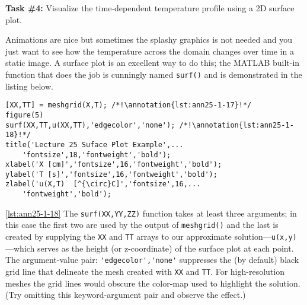 \vspace{0.25cm}
\setcounter{lstannotation}{0} %
\noindent\textbf{Task \#4: } Visualize the time-dependent temperature profile using a 2D surface plot.

\vspace{0.15cm}

\noindent Animations are nice but sometimes the splashy graphics is not needed and you just want to see how the temperature across the domain changes over time in a static image.  A surface plot is an excellent way to do this; the MATLAB built-in function that does the job is cunningly named \lstinline[style=myMatlab]{surf()} and is demonstrated in the listing below.
\begin{lstlisting}[style=myMatlab, name=lec25-ex1]
%% Plot the temperature vs time in a 2D plot using the surf function
[XX,TT] = meshgrid(X,T); /*!\annotation{lst:ann25-1-17}!*/
figure(5)
surf(XX,TT,u(XX,TT),'edgecolor','none'); /*!\annotation{lst:ann25-1-18}!*/
title('Lecture 25 Suface Plot Example',...
    'fontsize',18,'fontweight','bold');
xlabel('X [cm]','fontsize',16,'fontweight','bold');
ylabel('T [s]','fontsize',16,'fontweight','bold');
zlabel('u(X,T)  [^{\circ}C]','fontsize',16,...
    'fontweight','bold');
\end{lstlisting}

\vspace{0.2cm}

\ref{lst:ann25-1-18} The \lstinline[style=myMatlab]{surf(XX,YY,ZZ)} function takes at least three arguments; in this case the first two are used by the output of \lstinline[style=myMatlab]{meshgrid()} and the last is created by supplying the \lstinline{XX} and \lstinline{TT} arrays to our approximate solution---\lstinline{u(x,y)}---which serves as the height (or z-coordinate) of the surface plot at each point. The argument-value pair: \lstinline{'edgecolor','none'} suppresses the (by default) black grid line that delineate the mesh created with \lstinline{XX} and \lstinline{TT}.  For high-resolution meshes the grid lines would obscure the color-map used to highlight the solution. (Try omitting this keyword-argument pair and observe the effect.)

